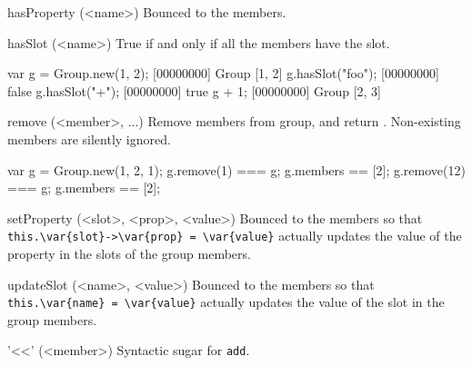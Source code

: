 \begin{urbiscriptapi}
\item[hasProperty](<name>)%
  Bounced to the members.

\item[hasSlot](<name>)%
  True if and only if all the members have the slot.

\begin{urbiscript}
var g = Group.new(1, 2);
[00000000] Group [1, 2]
g.hasSlot("foo");
[00000000] false
g.hasSlot("+");
[00000000] true
g + 1;
[00000000] Group [2, 3]
\end{urbiscript}

\item[remove](<member>, ...)%
  Remove members from \this group, and return \this.  Non-existing members
  are silently ignored.
\begin{urbiassert}
var g = Group.new(1, 2, 1);
g.remove(1) === g;   g.members == [2];
g.remove(12) === g;  g.members == [2];
\end{urbiassert}


\item[setProperty](<slot>, <prop>, <value>)%
  Bounced to the members so that
  \lstinline|this.\var{slot}->\var{prop} = \var{value}|
  actually updates the value of the property 
  in the slots  of the group members.

\item[updateSlot](<name>, <value>)%
  Bounced to the members so that
  \lstinline|this.\var{name} = \var{value}|
  actually updates the value of the slot  in
  the group members.

\item['<<'](<member>)%
  Syntactic sugar for \lstinline|add|.
\end{urbiscriptapi}

